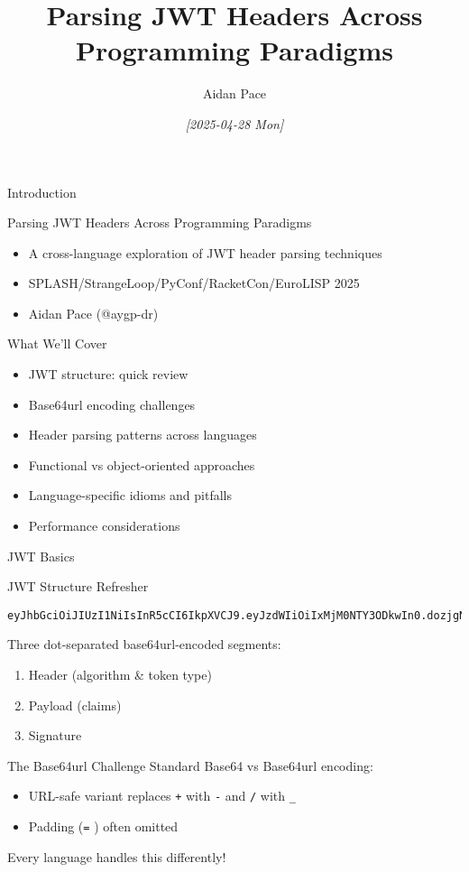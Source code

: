 \documentclass[presentation,aspectratio=169]{beamer}
\author{Aidan Pace}
\date{\textit{{[}2025-04-28 Mon]}}
\title{Parsing JWT Headers Across Programming Paradigms}
\begin{document}
\maketitle
\begin{frame}[label={sec:org2ae2373}]{Introduction}
\begin{block}{Parsing JWT Headers Across Programming Paradigms}
\begin{itemize}[<+->]
\item A cross-language exploration of JWT header parsing techniques
\item SPLASH/StrangeLoop/PyConf/RacketCon/EuroLISP 2025
\item Aidan Pace (@aygp-dr)
\end{itemize}
\end{block}
\begin{block}{What We'll Cover}
\begin{itemize}[<+->]
\item JWT structure: quick review
\item Base64url encoding challenges
\item Header parsing patterns across languages
\item Functional vs object-oriented approaches
\item Language-specific idioms and pitfalls
\item Performance considerations
\end{itemize}
\end{block}
\end{frame}
\begin{frame}[label={sec:org73ce3d5},fragile]{JWT Basics}
 \begin{block}{JWT Structure Refresher}
\begin{verbatim}
eyJhbGciOiJIUzI1NiIsInR5cCI6IkpXVCJ9.eyJzdWIiOiIxMjM0NTY3ODkwIn0.dozjgNryP4J3jVmNHl0w5N_XgL0n3I9PlFUP0THsR8U
\end{verbatim}

Three dot-separated base64url-encoded segments:
\begin{enumerate}
\item \alert{Header} (algorithm \& token type)
\item \alert{Payload} (claims)
\item \alert{Signature}
\end{enumerate}
\end{block}
\begin{block}{The Base64url Challenge}
Standard Base64 vs Base64url encoding:
\begin{itemize}
\item URL-safe variant replaces \texttt{+} with \texttt{-} and \texttt{/} with \texttt{\_}
\item Padding (\texttt{=} ) often omitted
\end{itemize}

\alert{Every language handles this differently!}
\end{block}
\end{frame}
\end{document}
